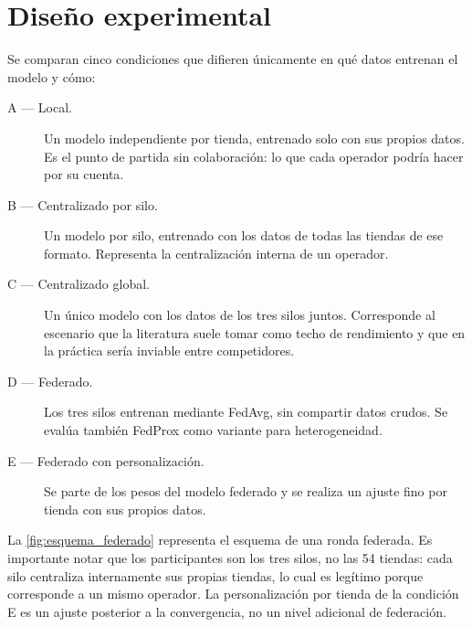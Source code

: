 \section{Diseño experimental}

Se comparan cinco condiciones que difieren únicamente en qué datos entrenan el modelo y cómo:

\begin{description}
  \item[A — Local.] Un modelo independiente por tienda, entrenado solo con sus propios datos. Es el
    punto de partida sin colaboración: lo que cada operador podría hacer por su cuenta.
  \item[B — Centralizado por silo.] Un modelo por silo, entrenado con los datos de todas las
    tiendas de ese formato. Representa la centralización interna de un operador.
  \item[C — Centralizado global.] Un único modelo con los datos de los tres silos juntos.
    Corresponde al escenario que la literatura suele tomar como techo de rendimiento y que en la
    práctica sería inviable entre competidores.
  \item[D — Federado.] Los tres silos entrenan mediante FedAvg, sin compartir datos crudos. Se
    evalúa también FedProx como variante para heterogeneidad.
  \item[E — Federado con personalización.] Se parte de los pesos del modelo federado y se realiza un
    ajuste fino por tienda con sus propios datos.
\end{description}

La \cref{fig:esquema_federado} representa el esquema de una ronda federada. Es importante notar que
los participantes son los tres silos, no las 54 tiendas: cada silo centraliza internamente sus
propias tiendas, lo cual es legítimo porque corresponde a un mismo operador. La personalización por
tienda de la condición E es un ajuste posterior a la convergencia, no un nivel adicional de
federación.

